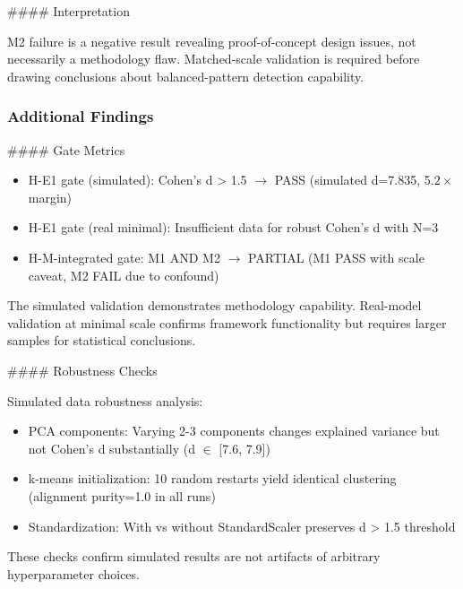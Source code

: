 \#\#\#\# Interpretation

M2 failure is a negative result revealing proof-of-concept design issues, not necessarily a methodology flaw. Matched-scale validation is required before drawing conclusions about balanced-pattern detection capability.

\subsubsection{Additional Findings}

\#\#\#\# Gate Metrics

\begin{itemize}
\item H-E1 gate (simulated): Cohen's d > 1.5 $\rightarrow$ PASS (simulated d=7.835, 5.$2\times$ margin)
\item H-E1 gate (real minimal): Insufficient data for robust Cohen's d with N=3
\item H-M-integrated gate: M1 AND M2 $\rightarrow$ PARTIAL (M1 PASS with scale caveat, M2 FAIL due to confound)
\end{itemize}

The simulated validation demonstrates methodology capability. Real-model validation at minimal scale confirms framework functionality but requires larger samples for statistical conclusions.

\#\#\#\# Robustness Checks

Simulated data robustness analysis:
\begin{itemize}
\item PCA components: Varying 2-3 components changes explained variance but not Cohen's d substantially (d $\in$ [7.6, 7.9])
\item k-means initialization: 10 random restarts yield identical clustering (alignment purity=1.0 in all runs)
\item Standardization: With vs without StandardScaler preserves d > 1.5 threshold
\end{itemize}

These checks confirm simulated results are not artifacts of arbitrary hyperparameter choices.
